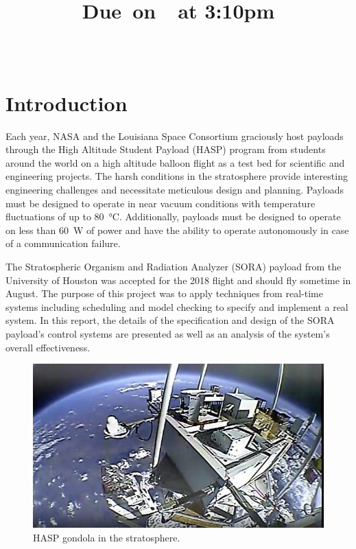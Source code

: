 \documentclass{article}
\title{
    \vspace{2in}
    \textmd{\textbf{ \hmwkTitle}}\\
    \normalsize\vspace{0.1in}\small{Due\ on\ \hmwkDueDate\ at 3:10pm}\\
    \vspace{0.1in}\large{\textit{\hmwkClassInstructor\ \hmwkClassTime}}
    \vspace{3in}
}
\author{\hmwkAuthorName}
\date{}
\begin{document}
\maketitle
\pagebreak
\tableofcontents
\pagebreak
\section{Introduction}


 Each year, NASA and the Louisiana Space Consortium graciously host payloads through the High Altitude Student Payload (HASP) program from students around the world on a high altitude balloon flight as a test bed for scientific and engineering projects. The harsh conditions in the stratosphere provide interesting engineering challenges and necessitate meticulous design and planning. Payloads must be designed to operate in near vacuum conditions with temperature fluctuations of up to \SI{80}{\celsius}. Additionally, payloads must be designed to operate on less than \SI{60}{\watt} of power and have the ability to operate autonomously in case of a communication failure. 
 
 
The Stratospheric Organism and Radiation Analyzer (SORA) payload from the University of Houston was accepted for the 2018 flight and should fly sometime in August. The purpose of this project was to apply techniques from real-time systems including scheduling and model checking to specify and implement a real system. In this report, the details of the specification and design of the SORA payload's control systems are presented as well as an analysis of the system's overall effectiveness.

\begin{figure}[H]
\centering
        \includegraphics[scale=.5]{sora_flight.jpg}
    \caption{HASP gondola in the stratosphere.}
    \label{fig:flight}
\end{figure}
\pagebreak
\end{document}
